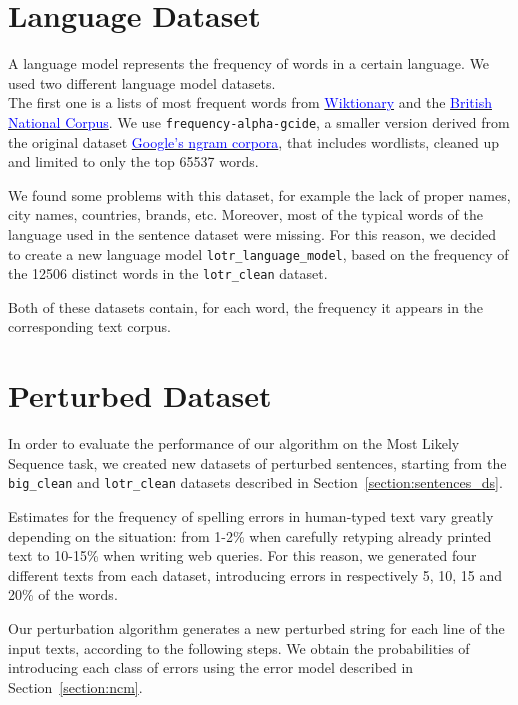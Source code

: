 \section{Language Dataset}
A language model represents the frequency of words in a certain language.
We used two different language model datasets. \\
The first one is a lists of most frequent words from 
\href{https://en.wiktionary.org/wiki/Wiktionary:Frequency_lists}{\textcolor{blue}{Wiktionary}} and the 
	\href{http://www.kilgarriff.co.uk/bnc-readme.html}{\textcolor{blue}{British National Corpus}}. 
We use \texttt{frequency-alpha-gcide}, a smaller version derived from the original dataset 
\href{https://books.google.com/ngrams/}{\textcolor{blue}{Google's ngram corpora}}, that includes wordlists, 
cleaned up and limited to only the top \num{65537} words.

We found some problems with this dataset, for example the lack of proper names, city names, countries, brands, 
etc. Moreover, most of the typical words of the language used in the sentence dataset were missing.
For this reason, we decided to create a new language model \texttt{lotr\_language\_model}, based on the 
frequency of the \num{12506} distinct words in the \texttt{lotr\_clean} dataset.

Both of these datasets contain, for each word, the frequency it appears in the corresponding text corpus.

\section{Perturbed Dataset}
\label{section:perturbed}
In order to evaluate the performance of our algorithm on the Most Likely Sequence task, we created new datasets of 
perturbed sentences, starting from the \texttt{big\_clean} and \texttt{lotr\_clean} datasets described in 
Section~\ref{section:sentences_ds}.

Estimates for the frequency of spelling errors in human-typed text vary greatly depending on the situation: from 1-2\% 
when carefully retyping already printed text to 10-15\% when writing web queries. For this reason, we generated four 
different texts from each dataset, introducing errors in respectively \num{5}, \num{10}, \num{15} and \num{20}\% of 
the words.

Our perturbation algorithm generates a new perturbed string for each line of the input texts, according to the 
following steps. We obtain the probabilities of introducing each class of errors using the error model described in  
Section~\ref{section:ncm}.

